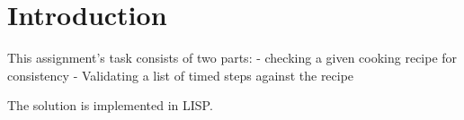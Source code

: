 \chapter{Introduction}

    This assignment's task consists of two parts:
        - checking a given cooking recipe for consistency
        - Validating a list of timed steps against the recipe
        
    The solution is implemented in LISP.
